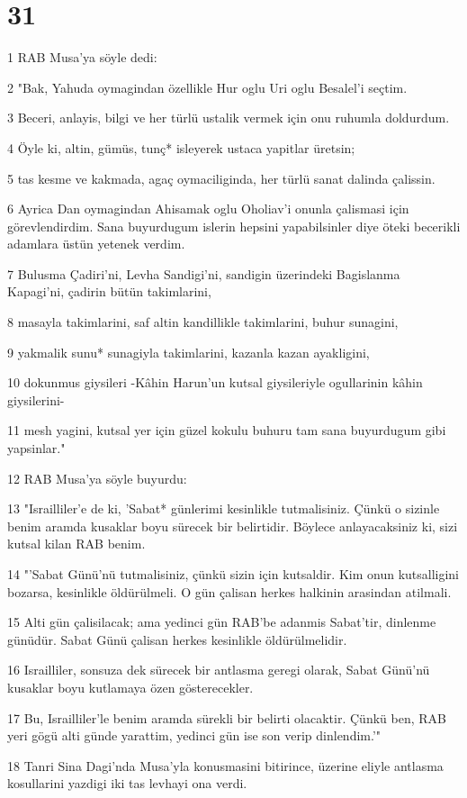 \chapter{31}

\par 1 RAB Musa'ya söyle dedi:
\par 2 "Bak, Yahuda oymagindan özellikle Hur oglu Uri oglu Besalel'i seçtim.
\par 3 Beceri, anlayis, bilgi ve her türlü ustalik vermek için onu ruhumla doldurdum.
\par 4 Öyle ki, altin, gümüs, tunç* isleyerek ustaca yapitlar üretsin;
\par 5 tas kesme ve kakmada, agaç oymaciliginda, her türlü sanat dalinda çalissin.
\par 6 Ayrica Dan oymagindan Ahisamak oglu Oholiav'i onunla çalismasi için görevlendirdim. Sana buyurdugum islerin hepsini yapabilsinler diye öteki becerikli adamlara üstün yetenek verdim.
\par 7 Bulusma Çadiri'ni, Levha Sandigi'ni, sandigin üzerindeki Bagislanma Kapagi'ni, çadirin bütün takimlarini,
\par 8 masayla takimlarini, saf altin kandillikle takimlarini, buhur sunagini,
\par 9 yakmalik sunu* sunagiyla takimlarini, kazanla kazan ayakligini,
\par 10 dokunmus giysileri -Kâhin Harun'un kutsal giysileriyle ogullarinin kâhin giysilerini-
\par 11 mesh yagini, kutsal yer için güzel kokulu buhuru tam sana buyurdugum gibi yapsinlar."
\par 12 RAB Musa'ya söyle buyurdu:
\par 13 "Israilliler'e de ki, 'Sabat* günlerimi kesinlikle tutmalisiniz. Çünkü o sizinle benim aramda kusaklar boyu sürecek bir belirtidir. Böylece anlayacaksiniz ki, sizi kutsal kilan RAB benim.
\par 14 "'Sabat Günü'nü tutmalisiniz, çünkü sizin için kutsaldir. Kim onun kutsalligini bozarsa, kesinlikle öldürülmeli. O gün çalisan herkes halkinin arasindan atilmali.
\par 15 Alti gün çalisilacak; ama yedinci gün RAB'be adanmis Sabat'tir, dinlenme günüdür. Sabat Günü çalisan herkes kesinlikle öldürülmelidir.
\par 16 Israilliler, sonsuza dek sürecek bir antlasma geregi olarak, Sabat Günü'nü kusaklar boyu kutlamaya özen gösterecekler.
\par 17 Bu, Israilliler'le benim aramda sürekli bir belirti olacaktir. Çünkü ben, RAB yeri gögü alti günde yarattim, yedinci gün ise son verip dinlendim.'"
\par 18 Tanri Sina Dagi'nda Musa'yla konusmasini bitirince, üzerine eliyle antlasma kosullarini yazdigi iki tas levhayi ona verdi.

